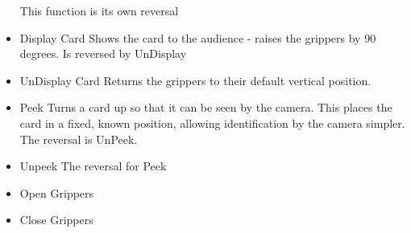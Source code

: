 \begin{itemize}
	\subitem This function is its own reversal
	\item Display Card
	\subitem Shows the card to the audience - raises the grippers by 90 degrees.
	\subitem Is reversed by UnDisplay
	\item UnDisplay Card
	\subitem Returns the grippers to their default vertical position.
	\item Peek
	\subitem Turns a card up so that it can be seen by the camera. This places the card in a fixed, known position, allowing identification by the camera simpler.
	\subitem The reversal is UnPeek. 
	\item Unpeek
	\subitem The reversal for Peek
	\item Open Grippers
	\item Close Grippers
	
\end{itemize}